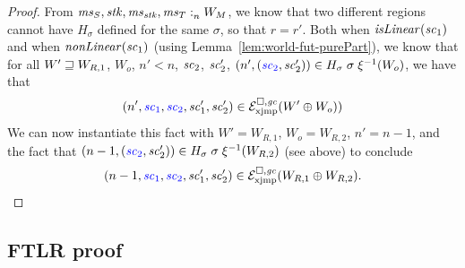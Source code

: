 \begin{proof}
  From $\memSat{\ms_S,\stk,\ms_\stk,\ms_T}{W_M}$, we know that two different regions cannot have $H_\sigma$ defined for the same $\sigma$, so that $r = r'$.
  Both when $\isLinear{\vsc_1}$ and when $\nonLinear{\vsc_1}$ (using Lemma~\ref{lem:world-fut-purePart}), we know that for all $W' \future W_{R,1}$, $W_o$, $n' < n$, $\vsc_2$, $\vsc_2'$, $\npair[n']{\stpair[.]{\vsc_2}{\vsc_2'}} \in H_\sigma \; \sigma \; \xi^{-1}(W_o)$, we have that
  \begin{equation*}
    \npair[n']{\src{\vsc_1},\src{\vsc_2},\vsc_1',\vsc_2'} \in \lrexj(W'\oplus W_o))
  \end{equation*}
  We can now instantiate this fact with $W' = W_{R,1}$, $W_o = W_{R,2}$, $n' = n-1$, and the fact that $\npair[n-1]{\stpair[.]{\vsc_2}{\vsc_2'}} \in H_\sigma \; \sigma \; \xi^{-1}(W_{R,2})$ (see above) to conclude
  \begin{equation*}
    \npair[n-1]{\src{\vsc_1},\src{\vsc_2},\vsc_1',\vsc_2'} \in \lrexj(W_{R,1}\oplus W_{R,2})\text{.}
  \end{equation*}
\end{proof}

\subsection{FTLR proof}

